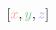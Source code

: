 \documentclass[preview]{standalone}
\begin{document}
$\left[\textcolor[HTML]{fea294}{x}, \textcolor[HTML]{81cb8f}{y}, \textcolor[HTML]{91abf6}{z}\right]$
\end{document}
